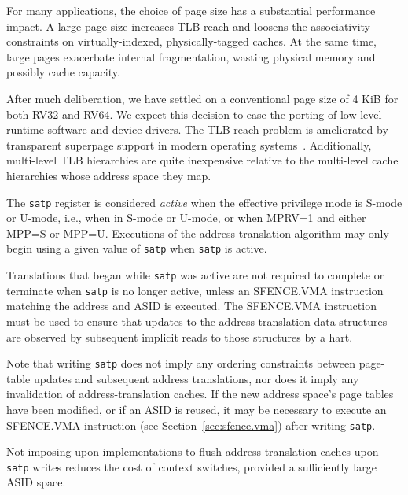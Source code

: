 \begin{commentary}
For many applications, the choice of page size has a substantial
performance impact.  A large page size increases TLB reach and loosens
the associativity constraints on virtually-indexed, physically-tagged
caches.  At the same time, large pages exacerbate internal
fragmentation, wasting physical memory and possibly cache capacity.

After much deliberation, we have settled on a conventional page size
of 4 KiB for both RV32 and RV64.  We expect this decision to ease the
porting of low-level runtime software and device drivers.  The TLB
reach problem is ameliorated by transparent superpage support in
modern operating systems~\cite{transparent-superpages}.  Additionally,
multi-level TLB hierarchies are quite inexpensive relative to the
multi-level cache hierarchies whose address space they map.
\end{commentary}

The {\tt satp} register is considered {\em active} when the effective
privilege mode is S-mode or U-mode, i.e., when in S-mode or U-mode,
or when MPRV=1 and either MPP=S or MPP=U.  Executions of the
address-translation algorithm may only begin using a given value of {\tt satp}
when {\tt satp} is active.

\begin{commentary}
Translations that began while {\tt satp} was active are not required to
complete or terminate when {\tt satp} is no longer active, unless an
SFENCE.VMA instruction matching the address and ASID is executed.  The
SFENCE.VMA instruction must be used to ensure that updates to the
address-translation data structures are observed by subsequent implicit reads
to those structures by a hart.
\end{commentary}

Note that writing {\tt satp} does not imply any ordering constraints
between page-table updates and subsequent address translations, nor does
it imply any invalidation of address-translation caches.
If the new address space's page tables have been modified, or if an
ASID is reused, it may be necessary to execute an SFENCE.VMA instruction
(see Section~\ref{sec:sfence.vma}) after writing {\tt satp}.

\begin{commentary}
Not imposing upon implementations to flush address-translation caches
upon {\tt satp} writes reduces the cost of context switches, provided
a sufficiently large ASID space.
\end{commentary}

